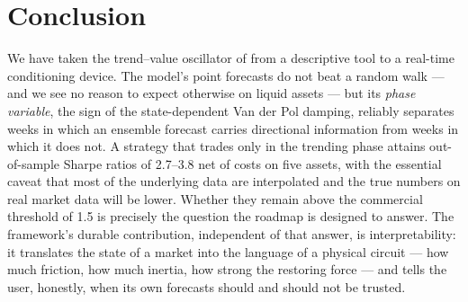 \documentclass[11pt,a4paper]{article}
\begin{document}
\section{Conclusion}\label{sec:conclusion}

We have taken the trend--value oscillator of \citet{majewski2020co} from a descriptive tool to a real-time conditioning device. The model's point forecasts do not beat a random walk --- and we see no reason to expect otherwise on liquid assets --- but its \emph{phase variable}, the sign of the state-dependent Van der Pol damping, reliably separates weeks in which an ensemble forecast carries directional information from weeks in which it does not. A strategy that trades only in the trending phase attains out-of-sample Sharpe ratios of 2.7--3.8 net of costs on five assets, with the essential caveat that most of the underlying data are interpolated and the true numbers on real market data will be lower. Whether they remain above the commercial threshold of 1.5 is precisely the question the roadmap is designed to answer. The framework's durable contribution, independent of that answer, is interpretability: it translates the state of a market into the language of a physical circuit --- how much friction, how much inertia, how strong the restoring force --- and tells the user, honestly, when its own forecasts should and should not be trusted.
\end{document}
